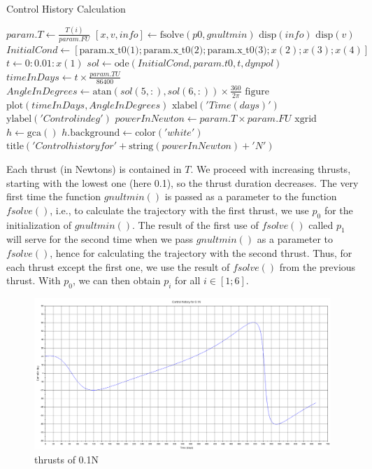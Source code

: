\documentclass{article}
\begin{document}
	\begin{algorithm}[H]
		\caption{Control History Calculation}
		\begin{algorithmic}[1]
			\State $param.T \gets \frac{T(i)}{param.FU}$
			\State $[x, v, info] \gets \text{fsolve}(p0, gnultmin)$
			\State $\text{disp}(info)$
			\State $\text{disp}(v)$
			\State $InitialCond \gets [\text{param.x\_t0(1)}; \text{param.x\_t0(2)}; \text{param.x\_t0(3)}; x(2); x(3); x(4)]$
			\State $t \gets 0:0.01:x(1)$
			\State $sol \gets \text{ode}(InitialCond, param.t0, t, dynpol)$
			\State $timeInDays \gets t \times \frac{param.TU}{86400}$
			\State $AngleInDegrees \gets \text{atan}(sol(5,:), sol(6,:)) \times \frac{360}{2\pi}$
			\State $\text{figure}$
			\State $\text{plot}(timeInDays, AngleInDegrees)$
			\State $\text{xlabel}('Time (days)')$
			\State $\text{ylabel}('Control in deg')$
			\State $powerInNewton \gets param.T \times param.FU$
			\State $\text{xgrid}$
			\State $h \gets \text{gca}()$
			\State $h.\text{background} \gets \text{color}('white')$
			\State $\text{title}('Control history for ' + \text{string}(powerInNewton) + 'N')$
			\EndFor
		\end{algorithmic}
	\end{algorithm}
	
	
	Each thrust (in Newtons) is contained in \( T \). We proceed with increasing thrusts, starting with the lowest one (here 0.1), so the thrust duration decreases. The very first time the function \( gnultmin() \) is passed as a parameter to the function \( fsolve() \), i.e., to calculate the trajectory with the first thrust, we use \( p_0 \) for the initialization of \( gnultmin() \). The result of the first use of \( fsolve() \) called \( p_1 \) will serve for the second time when we pass \( gnultmin() \) as a parameter to \( fsolve() \), hence for calculating the trajectory with the second thrust. Thus, for each thrust except the first one, we use the result of \( fsolve() \) from the previous thrust. With \( p_0 \), we can then obtain \( p_i \) for all \( i \in [1; 6] \).
	
	\begin{figure}[htbp]
		\centering
		\includegraphics[width=\textwidth]{figure0.png}
		\caption{thrusts of 0.1N}
		\label{fig:0.1}
	\end{figure}
	
\end{document}
